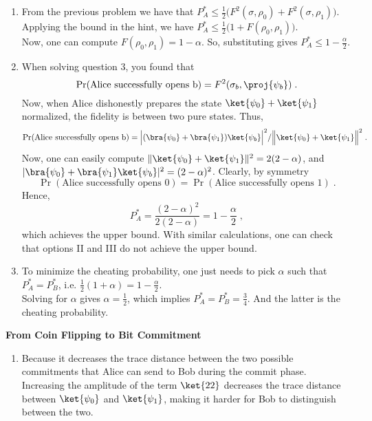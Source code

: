 \begin{exercises}
\begin{enumerate}
\item From the previous problem we have that $P_A^* \leq \frac12 \Big(F^2(\sigma, \rho_0) + F^2(\sigma, \rho_1)\Big)$.\\
Applying the bound in the hint, we have $P_A^* \leq \frac12 \Big(1 + F(\rho_0, \rho_1)\Big)$. \\
Now, one can compute $F(\rho_0, \rho_1) = 1-\alpha$. So, substituting gives $P_A^* \leq 1-\frac{\alpha}{2}$.

\item When solving question 3, you found that 
\[\Pr(\mbox{Alice successfully opens b}) = F^2(\sigma_b, \proj{\psi_b})\;.\]
Now, when Alice dishonestly prepares the state $\ket{\psi_0} + \ket{\psi_1}$ normalized, the fidelity is between two pure states. Thus,
\begin{equation*}
\Pr(\mbox{Alice successfully opens b}) = \Big|(\bra{\psi_0}+\bra{\psi_1}) \ket{\psi_b}\Big|^2/\Big\|\ket{\psi_0}+\ket{\psi_1} \Big\|^2\;.
\end{equation*}
Now, one can easily compute $\|\ket{\psi_0}+\ket{\psi_1} \|^2 = 2(2-\alpha)$, and $|\bra{\psi_0}+\bra{\psi_1} \ket{\psi_b}|^2 = (2-\alpha)^2$.
Clearly, by symmetry 
\[\Pr(\mbox{Alice successfully opens 0}) = \Pr(\mbox{Alice successfully opens 1})\;.\] Hence,
\begin{equation}
P_A^* = \frac{(2-\alpha)^2}{2(2-\alpha)} = 1-\frac{\alpha}{2}\;,
\end{equation}
which achieves the upper bound.
With similar calculations, one can check that options II and III do not achieve the upper bound.

\item To minimize the cheating probability, one just needs to pick $\alpha$ such that $P_A^* = P_B^*$, i.e. $\frac12(1+\alpha) = 1-\frac{\alpha}{2}$.\\
Solving for $\alpha$ gives $\alpha = \frac12$, which implies $P_A^* = P_B^* = \frac34$. And the latter is the cheating probability.
\end{enumerate}


\item {\bf From Coin Flipping to Bit Commitment}
\begin{enumerate}
\item Because it decreases the trace distance between the two possible commitments that Alice can send to Bob during the commit phase. Increasing the amplitude of the term $\ket{22}$ decreases the trace distance between $\ket{\psi_0}$ and $\ket{\psi_1}$, making it harder for Bob to distinguish between the two.


\end{enumerate}
\end{exercises}
